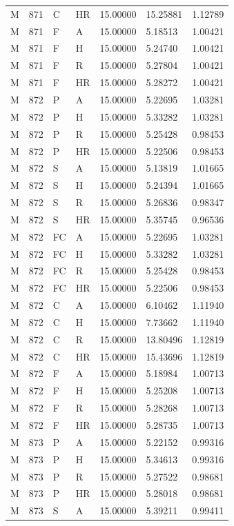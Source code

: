 \begin{longtable}{lllllll}
M & 871 & C & HR & 15.00000 & 15.25881 & 1.12789\\
M & 871 & F & A & 15.00000 & 5.18513 & 1.00421\\
M & 871 & F & H & 15.00000 & 5.24740 & 1.00421\\
M & 871 & F & R & 15.00000 & 5.27804 & 1.00421\\
M & 871 & F & HR & 15.00000 & 5.28272 & 1.00421\\
M & 872 & P & A & 15.00000 & 5.22695 & 1.03281\\
M & 872 & P & H & 15.00000 & 5.33282 & 1.03281\\
M & 872 & P & R & 15.00000 & 5.25428 & 0.98453\\
M & 872 & P & HR & 15.00000 & 5.22506 & 0.98453\\
M & 872 & S & A & 15.00000 & 5.13819 & 1.01665\\
M & 872 & S & H & 15.00000 & 5.24394 & 1.01665\\
M & 872 & S & R & 15.00000 & 5.26836 & 0.98347\\
M & 872 & S & HR & 15.00000 & 5.35745 & 0.96536\\
M & 872 & FC & A & 15.00000 & 5.22695 & 1.03281\\
M & 872 & FC & H & 15.00000 & 5.33282 & 1.03281\\
M & 872 & FC & R & 15.00000 & 5.25428 & 0.98453\\
M & 872 & FC & HR & 15.00000 & 5.22506 & 0.98453\\
M & 872 & C & A & 15.00000 & 6.10462 & 1.11940\\
M & 872 & C & H & 15.00000 & 7.73662 & 1.11940\\
M & 872 & C & R & 15.00000 & 13.80496 & 1.12819\\
M & 872 & C & HR & 15.00000 & 15.43696 & 1.12819\\
M & 872 & F & A & 15.00000 & 5.18984 & 1.00713\\
M & 872 & F & H & 15.00000 & 5.25208 & 1.00713\\
M & 872 & F & R & 15.00000 & 5.28268 & 1.00713\\
M & 872 & F & HR & 15.00000 & 5.28735 & 1.00713\\
M & 873 & P & A & 15.00000 & 5.22152 & 0.99316\\
M & 873 & P & H & 15.00000 & 5.34613 & 0.99316\\
M & 873 & P & R & 15.00000 & 5.27522 & 0.98681\\
M & 873 & P & HR & 15.00000 & 5.28018 & 0.98681\\
M & 873 & S & A & 15.00000 & 5.39211 & 0.99411\\

\end{longtable}
